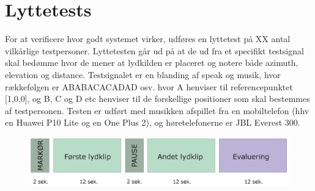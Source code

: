 \section{Lyttetests}
For at verificere hvor godt systemet virker, udføres en lyttetest på XX  antal vilkårlige testpersoner. Lyttetesten går ud på at de ud fra et specifikt testsignal skal bedømme hvor de mener at lydkilden er placeret og notere både azimuth, elevation og distance. Testsignalet er en blanding af speak og musik, hvor rækkefølgen er ABABACACADAD osv. hvor A henviser til referencepunktet [1,0,0], og B, C og D etc henviser til de forskellige positioner som skal bestemmes af testpersonen.
Testen er udført med musikken afspillet fra en mobiltelefon (hhv en Huawei P10 Lite og en One Plus 2), og høretelefonerne er JBL Everest 300. 

\begin{figure}[h!]
	\centering
	\includegraphics[width=0.7\linewidth]{All_Pics/ABtest}
	\caption{}
	\label{fig:abtest}
\end{figure}
